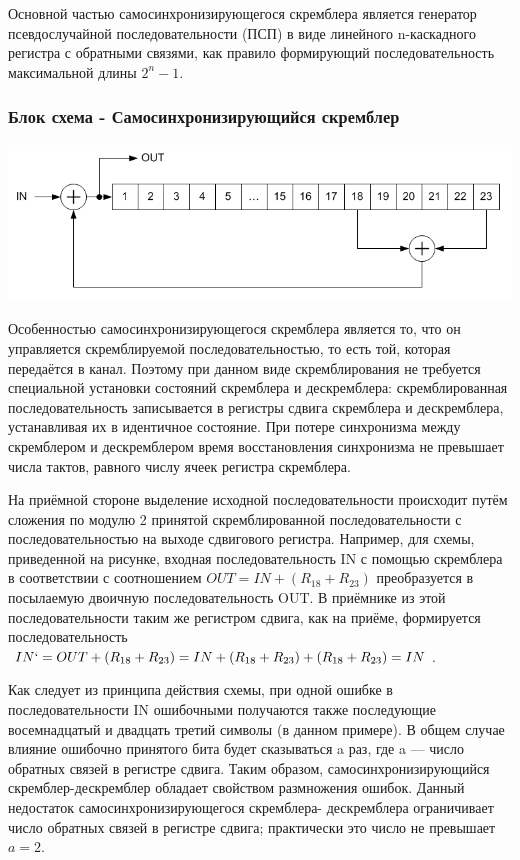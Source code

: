 Основной частью самосинхронизирующегося скремблера является генератор псевдослучайной последовательности (ПСП) в виде линейного n-каскадного регистра с обратными связями, как правило формирующий последовательность максимальной длины $2^n - 1$.

\subsubsection{Блок схема - Самосинхронизирующийся скремблер}
\begin{center}
\includegraphics[scale = 0.6]{Scrambler_randomizer_multiplicative_scrambler}
 \end{center}
 
Особенностью самосинхронизирующегося скремблера является то, что он управляется скремблируемой последовательностью, то есть той, которая передаётся в канал. Поэтому при данном виде скремблирования не требуется специальной установки состояний скремблера и дескремблера: скремблированная последовательность записывается в регистры сдвига скремблера и дескремблера, устанавливая их в идентичное состояние. При потере синхронизма между скремблером и дескремблером время восстановления синхронизма не превышает числа тактов, равного числу ячеек регистра скремблера. 

На приёмной стороне выделение исходной последовательности происходит путём сложения по модулю 2 принятой скремблированной последовательности с последовательностью на выходе сдвигового регистра. Например, для схемы, приведенной на рисунке, входная последовательность IN с помощью скремблера в соответствии с соотношением $ OUT = IN+(R_{18}+R_{23})$ преобразуется в посылаемую двоичную последовательность OUT. В приёмнике из этой последовательности таким же регистром сдвига, как на приёме, формируется последовательность  $IN` = OUT + (R_{18}+R_{23}) = IN+(R_{18}+R_{23})+(R_{18}+R_{23}) = IN $.

Как следует из принципа действия схемы, при одной ошибке в последовательности IN ошибочными получаются также последующие восемнадцатый и двадцать третий символы (в данном примере). В общем случае влияние ошибочно принятого бита будет сказываться a раз, где a — число обратных связей в регистре сдвига. Таким образом, самосинхронизирующийся скремблер-дескремблер обладает свойством размножения ошибок. Данный недостаток самосинхронизирующегося скремблера- дескремблера ограничивает число обратных связей в регистре сдвига; практически это число не превышает $a = 2$.

